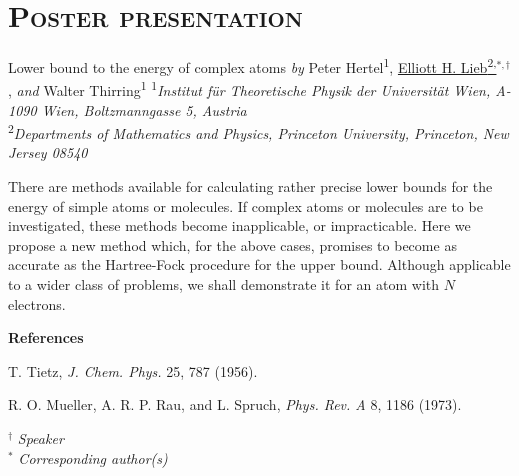 \documentclass[12pt]{book}
\newenvironment{conf-abstract}[4][]{
  \needspace{10\baselineskip}
  \begin{center}
    { \renewcommand\textsuperscript[1]{}
      \phantomsection\addcontentsline{toc}{section}
      {\texorpdfstring{#2 (\emph{#3})}{#2 (#3)}}
    }
    {{\large\bfseries #2}\marginnote{#1}\par}
    \bigskip\smallskip
    {#3\par}
    \smallskip
    {\small #4\par}
  \end{center}
}{%
  \bigskip
  \hrule
  \bigskip
}
\newcommand{\indexauthors}[1]{%
  \forcsvlist{\index}{#1}
}
\begin{document}
\section{\textsc{Poster presentation}}

\noindent \hrulefill

\begin{conf-abstract}[PP-XX] %
{Lower bound to the energy of complex atoms}  
{\textit{by} Peter Hertel\textsuperscript{1}, \href{mailto:lieb@math.princeton.edu}{Elliott H. Lieb\textsuperscript{2,}$^{*,\dag}$}, \textit{and} Walter Thirring\textsuperscript{1}} %
{\textsuperscript{1}\textit{Institut für Theoretische Physik der Universität Wien, A-1090 Wien, Boltzmanngasse 5, Austria}\\ 
{\textsuperscript{2}\textit{Departments of Mathematics and Physics, Princeton University, Princeton, New Jersey 08540}}\\
}
\indexauthors{lieb}

There are methods available for calculating rather precise lower bounds for the energy of simple atoms or molecules. If complex atoms or molecules are to be investigated, these methods become inapplicable, or impracticable. Here we propose a new method which, for the above cases, promises to become as accurate as the Hartree-Fock procedure for the upper bound. Although applicable to a wider class of problems, we shall demonstrate it for an atom with $N$ electrons.


{\small{
{$\;$\\\bf References}%
\begin{enumerate}[label={[\arabic*]}]
\item T. Tietz, \textit{J. Chem. Phys.} 25, 787 (1956).
\vspace*{-0.3cm}\item R. O. Mueller, A. R. P. Rau, and L. Spruch, \textit{Phys. Rev. A} 8, 1186 (1973).
\end{enumerate}
}}

\noindent $^\dag$ \textit{Speaker}\\
$^*$ \textit{Corresponding author(s)}

\end{conf-abstract}
 
\end{document}
